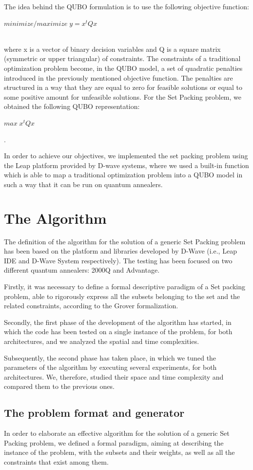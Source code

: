 \documentclass[oneside,a4paper]{article}
\begin{document}
The idea behind the QUBO formulation is to use the following objective function:\\
\centerline{${minimize/maximize\; y = x^tQx}$}\\
where x is a vector of binary decision variables and Q is a square matrix (symmetric or upper triangular) of constraints. The constraints of a traditional optimization problem become, in the QUBO model, a set of quadratic penalties introduced in the previously mentioned objective function. The penalties are structured in a way that they are equal to zero for feasible solutions or equal to some positive amount for unfeasible solutions. For the Set Packing problem, we obtained the following QUBO representation: \centerline{${max\; x^tQx}$}.

In order to achieve our objectives, we implemented the set packing problem using the Leap platform provided by D-wave systems, where we used a built-in function which is able to map a traditional optimization problem into a QUBO model in such a way that it can be run on quantum annealers.

\section{The Algorithm}
The definition of the algorithm for the solution of a generic Set Packing problem has been based on the platform and libraries developed by D-Wave (i.e., Leap IDE \cite{WebSite8} and D-Wave System \cite{WebSite5} respectively). The testing has been focused on two different quantum annealers: 2000Q and Advantage.

Firstly, it was necessary to define a formal descriptive paradigm of a Set packing problem, able to rigorously express all the subsets belonging to the set and the related constraints, according to the Grover formalization. 

Secondly, the first phase of the development of the algorithm has started, in which the code has been tested on a single instance of the problem, for both architectures, and we analyzed the spatial and time complexities.

Subsequently, the second phase has taken place, in which we tuned the parameters of the algorithm by executing several experiments, for both architectures. We, therefore,  studied their space and time complexity and compared them to the previous ones. 
\subsection{The problem format and generator}
In order to elaborate an effective algorithm for the solution of a generic Set Packing problem, we defined a formal paradigm, aiming at describing the instance of the problem, with the subsets and their weights, as well as all the constraints that exist among them.
\end{document}
